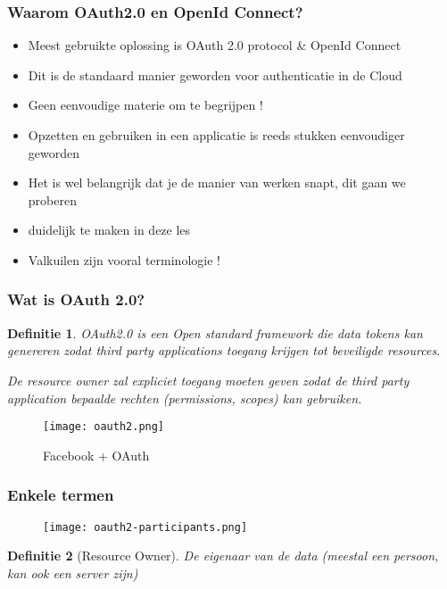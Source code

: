 \documentclass{article}
\newtheorem{theorem}{Definitie}[section]
\begin{document}
\subsubsection{Waarom OAuth2.0 en OpenId Connect?}

\begin{itemize}
    \item Meest gebruikte oplossing is OAuth 2.0 protocol \& OpenId Connect
    \item Dit is de standaard manier geworden voor authenticatie in de Cloud
    \item Geen eenvoudige materie om te begrijpen !
    \item Opzetten en gebruiken in een applicatie is reeds stukken eenvoudiger geworden
    \item Het is wel belangrijk dat je de manier van werken snapt, dit gaan we proberen
    \item duidelijk te maken in deze les
    \item Valkuilen zijn vooral terminologie !
\end{itemize}

\subsubsection{Wat is OAuth 2.0?}

\begin{theorem}
    OAuth2.0 is een Open standard framework die data tokens kan genereren zodat 
    third party applications toegang krijgen tot beveiligde resources.

    De resource owner zal expliciet toegang moeten geven zodat de third party 
    application bepaalde rechten (permissions, scopes) kan gebruiken.
\end{theorem}

\begin{figure}[H]
    \centering
    \texttt{[image: oauth2.png]}
    \caption{Facebook + OAuth}
\end{figure}

\subsubsection{Enkele termen}

\begin{figure}[H]
    \centering
    \texttt{[image: oauth2-participants.png]}
\end{figure}

\begin{theorem}[Resource Owner]
    De eigenaar van de data (meestal een persoon, kan ook een server zijn)
\end{theorem}
\end{document}
